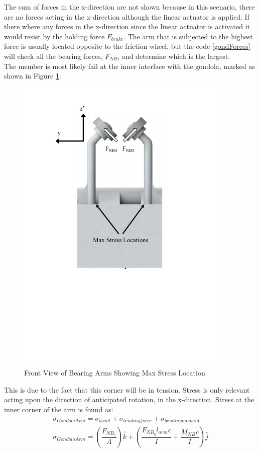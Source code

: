 \documentclass[../main.tex]{subfiles}
\begin{document}
The sum of forces in the x-direction are not shown because in this scenario, there are no forces acting in the x-direction although the linear actuator is applied. If there where any forces in the x-direction since the linear actuator is activated it would resist by the holding force $F_{brake}$. The arm that is subjected to the highest force is usually located opposite to the friction wheel, but the code \ref{gondForces} will check all the bearing forces, $F_{NB}$, and determine which is the largest. \\

The member is most likely fail at the inner interface with the gondola, marked as shown in Figure \ref{fig:armStressLocation}.
\begin{figure}[H]
	\centering
	\includegraphics[width=0.9\textwidth]{img/gondola/BearingArmStressLocation.pdf}
	\caption{Front View of Bearing Arms Showing Max Stress Location}
	\label{fig:armStressLocation}
\end{figure}
This is due to the fact that this corner will be in tension. Stress is only relevant acting upon the direction of anticipated rotation, in the x-direction. Stress at the inner corner of the arm is found as:
\begin{align}
	\sigma _{Gondola Arm} = \sigma _{axial} + \sigma _{bending force} + \sigma _{bending moment} \\ \label{armStress}
	\sigma _{Gondola Arm}  = \left(\dfrac{F_{NB_{z}}}{A}\right)\hat{k} + \left(\dfrac{F_{NB_{y}}l_{arm}c}{I}  + \dfrac{M_{NB}c}{I} \right) \hat{j}
\end{align}
\end{document}
